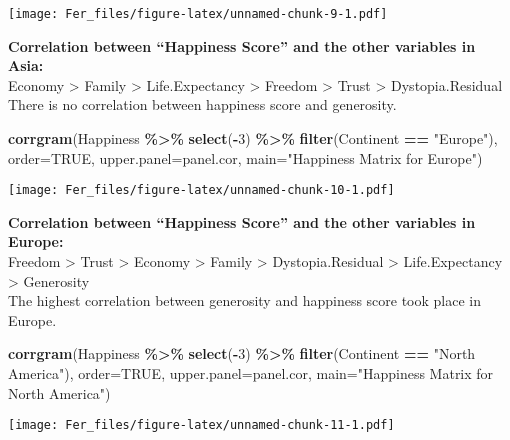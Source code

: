 \documentclass[
]{article}
\newenvironment{Shaded}{\begin{snugshade}}{\end{snugshade}}
\newcommand{\AttributeTok}[1]{\textcolor[rgb]{0.13,0.29,0.53}{#1}}
\newcommand{\ConstantTok}[1]{\textcolor[rgb]{0.56,0.35,0.01}{#1}}
\newcommand{\DecValTok}[1]{\textcolor[rgb]{0.00,0.00,0.81}{#1}}
\newcommand{\FunctionTok}[1]{\textcolor[rgb]{0.13,0.29,0.53}{\textbf{#1}}}
\newcommand{\NormalTok}[1]{#1}
\newcommand{\SpecialCharTok}[1]{\textcolor[rgb]{0.81,0.36,0.00}{\textbf{#1}}}
\newcommand{\StringTok}[1]{\textcolor[rgb]{0.31,0.60,0.02}{#1}}
\begin{document}
\texttt{[image: Fer\_files/figure-latex/unnamed-chunk-9-1.pdf]}

\textbf{Correlation between ``Happiness Score'' and the other variables
in Asia:}\\
Economy \textgreater{} Family \textgreater{} Life.Expectancy
\textgreater{} Freedom \textgreater{} Trust \textgreater{}
Dystopia.Residual\\
There is no correlation between happiness score and generosity.

\begin{Shaded}
\begin{Highlighting}[]
\FunctionTok{corrgram}\NormalTok{(Happiness }\SpecialCharTok{\%\textgreater{}\%} \FunctionTok{select}\NormalTok{(}\SpecialCharTok{{-}}\DecValTok{3}\NormalTok{) }\SpecialCharTok{\%\textgreater{}\%} \FunctionTok{filter}\NormalTok{(Continent }\SpecialCharTok{==} \StringTok{"Europe"}\NormalTok{), }\AttributeTok{order=}\ConstantTok{TRUE}\NormalTok{,}
         \AttributeTok{upper.panel=}\NormalTok{panel.cor, }\AttributeTok{main=}\StringTok{"Happiness Matrix for Europe"}\NormalTok{)}
\end{Highlighting}
\end{Shaded}

\texttt{[image: Fer\_files/figure-latex/unnamed-chunk-10-1.pdf]}

\textbf{Correlation between ``Happiness Score'' and the other variables
in Europe:}\\
Freedom \textgreater{} Trust \textgreater{} Economy \textgreater{}
Family \textgreater{} Dystopia.Residual \textgreater{} Life.Expectancy
\textgreater{} Generosity\\
The highest correlation between generosity and happiness score took
place in Europe.

\begin{Shaded}
\begin{Highlighting}[]
\FunctionTok{corrgram}\NormalTok{(Happiness }\SpecialCharTok{\%\textgreater{}\%} \FunctionTok{select}\NormalTok{(}\SpecialCharTok{{-}}\DecValTok{3}\NormalTok{) }\SpecialCharTok{\%\textgreater{}\%} \FunctionTok{filter}\NormalTok{(Continent }\SpecialCharTok{==} \StringTok{"North America"}\NormalTok{), }\AttributeTok{order=}\ConstantTok{TRUE}\NormalTok{,}
         \AttributeTok{upper.panel=}\NormalTok{panel.cor, }\AttributeTok{main=}\StringTok{"Happiness Matrix for North America"}\NormalTok{)}
\end{Highlighting}
\end{Shaded}

\texttt{[image: Fer\_files/figure-latex/unnamed-chunk-11-1.pdf]}
\end{document}
